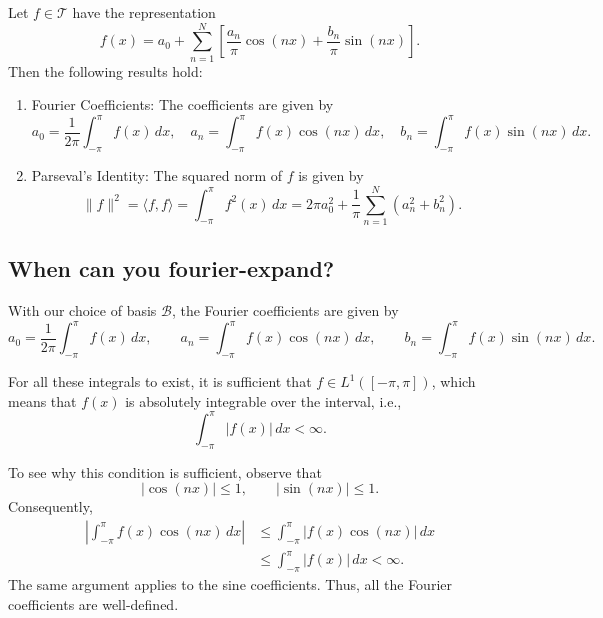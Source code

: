 \documentclass[10pt,a4paper]{article}
\begin{document}
\begin{theorem}
Let \(f\in\mathcal{T}\) have the representation
\[
    f(x)=a_0+\sum_{n=1}^{N}
    \left[
        \frac{a_n}{\pi}\cos(nx)
        +\frac{b_n}{\pi}\sin(nx)
    \right].
\]
Then the following results hold:

\begin{enumerate}
    \item \textup{Fourier Coefficients:}  The coefficients are given by
    \[
        a_0=\frac{1}{2\pi}\int_{-\pi}^{\pi}f(x)\,dx,
        \quad
        a_n=\int_{-\pi}^{\pi}f(x)\cos(nx)\,dx,
        \quad
        b_n=\int_{-\pi}^{\pi}f(x)\sin(nx)\,dx.
    \]

    \item \textup{Parseval's Identity:} The squared norm of \(f\) is given by
    \[
        \lVert f\rVert^2
        =\langle f,f\rangle
        =\int_{-\pi}^{\pi}f^2(x)\,dx
        =2\pi a_0^2+\frac{1}{\pi}
        \sum_{n=1}^{N}(a_n^2+b_n^2).
    \]
\end{enumerate}
\end{theorem}

\subsection{When can you fourier-expand?}
With our choice of basis \(\mathcal{B}\), the Fourier coefficients
are given by
\[
    a_0=\frac{1}{2\pi}\int_{-\pi}^{\pi}f(x)\,dx,
    \qquad
    a_n=\int_{-\pi}^{\pi}f(x)\cos(nx)\,dx,
    \qquad
    b_n=\int_{-\pi}^{\pi}f(x)\sin(nx)\,dx.
\]

For all these integrals to exist, it is sufficient that
\(f\in L^1([-\pi,\pi])\), which means that \(f(x)\) is
absolutely integrable over the interval, i.e.,
\[
    \int_{-\pi}^{\pi}|f(x)|\,dx<\infty.
\]

To see why this condition is sufficient, observe that
\[
    |\cos(nx)|\leq 1,
    \qquad
    |\sin(nx)|\leq 1.
\]
Consequently,
\[
\begin{aligned}
    \left|\int_{-\pi}^{\pi}f(x)\cos(nx)\,dx\right|
    &\leq \int_{-\pi}^{\pi}|f(x)\cos(nx)|\,dx\\
    &\leq \int_{-\pi}^{\pi}|f(x)|\,dx<\infty.
\end{aligned}
\]
The same argument applies to the sine coefficients. Thus,
all the Fourier coefficients are well-defined.
\end{document}
